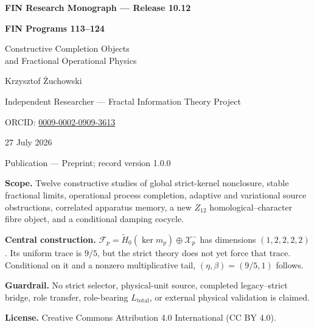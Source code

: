 \documentclass[11pt,a4paper,openany]{report}
\begin{document}
\hypersetup{pageanchor=false}
\begin{titlepage}
\centering
\vspace*{9mm}
{\Large\bfseries FIN Research Monograph --- Release 10.12\par}
\vspace{11mm}
{\Huge\bfseries FIN Programs 113--124\par}
\vspace{6mm}
{\Large Constructive Completion Objects\\
and Fractional Operational Physics\par}
\vspace{17mm}
{\Large Krzysztof \.Zuchowski\par}
\vspace{2mm}
{\normalsize Independent Researcher --- Fractal Information Theory Project\par}
\vspace{2mm}
{\normalsize ORCID: \href{https://orcid.org/0009-0002-0909-3613}{0009-0002-0909-3613}\par}
\vspace{10mm}
{\large 27 July 2026\par}
{\normalsize Publication --- Preprint; record version 1.0.0\par}
\vfill
\begin{minipage}{0.88\textwidth}
\small
\textbf{Scope.} Twelve constructive studies of global strict-kernel
nonclosure, stable fractional limits, operational process completion,
adaptive and variational source obstructions, correlated apparatus memory,
a new \(Z_{12}\) homological--character fibre object, and a conditional
damping cocycle.

\medskip
\textbf{Central construction.}
\(\mathcal F_p=\widetilde H_0(\ker m_p)\oplus\mathcal X_p^-\) has dimensions
\((1,2,2,2,2)\). Its uniform trace is \(9/5\), but the strict theory does not
yet force that trace. Conditional on it and a nonzero multiplicative tail,
\((\eta,\beta)=(9/5,1)\) follows.

\medskip
\textbf{Guardrail.} No strict selector, physical-unit source, completed
legacy--strict bridge, role transfer, role-bearing \(L_{\mathrm{total}}\), or
external physical validation is claimed.

\medskip
\textbf{License.} Creative Commons Attribution 4.0 International (CC BY 4.0).
\end{minipage}
\vfill
\end{titlepage}
\hypersetup{pageanchor=true}
\end{document}
